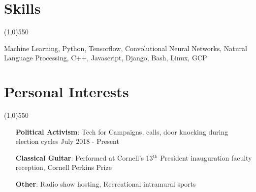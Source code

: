 \documentclass[11pt]{article} %
\begin{document}
	\section*{Skills}
	\vspace{-7ex}
	\begin{center}
    \line(1,0){550}
    \end{center}
    Machine Learning, Python, Tensorflow, Convolutional Neural Networks, Natural Language Processing, C++, Javascript, Django, Bash, Linux, GCP 

	\vspace{+1ex}
	\section*{Personal Interests}
	\vspace{-7ex}
	\begin{center}
    \line(1,0){550}
    \end{center}
    \vspace{-2ex}
	\begin{itemize}
		\item[\textbf{Political Activism}:] Tech for Campaigns, calls, door knocking during election cycles \hfill July 2018 - Present 
		\item[\textbf{Classical Guitar}:] Performed at Cornell's 13$^\textrm{th}$ President inauguration faculty reception, Cornell Perkins Prize 
		\item[\textbf{Other}:] Radio show hosting, Recreational intramural sports
	\end{itemize}
	
\end{document}
